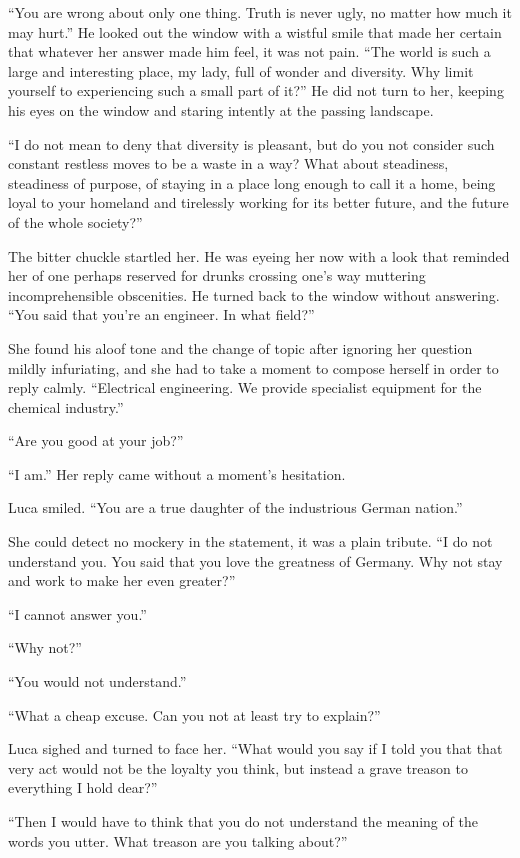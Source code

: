 ``You are wrong about only one thing. Truth is never ugly, no matter how much it may hurt.'' He looked out the window with a wistful smile that made her certain that whatever her answer made him feel, it was not pain. ``The world is such a large and interesting place, my lady, full of wonder and diversity. Why limit yourself to experiencing such a small part of it?'' He did not turn to her, keeping his eyes on the window and staring intently at the passing landscape.

``I do not mean to deny that diversity is pleasant, but do you not consider such constant restless moves to be a waste in a way? What about steadiness, steadiness of purpose, of staying in a place long enough to call it a home, being loyal to your homeland and tirelessly working for its better future, and the future of the whole society?''

The bitter chuckle startled her. He was eyeing her now with a look that reminded her of one perhaps reserved for drunks crossing one's way muttering incomprehensible obscenities. He turned back to the window without answering. ``You said that you're an engineer. In what field?''

She found his aloof tone and the change of topic after ignoring her question mildly infuriating, and she had to take a moment to compose herself in order to reply calmly. ``Electrical engineering. We provide specialist equipment for the chemical industry.''

``Are you good at your job?''

``I am.'' Her reply came without a moment's hesitation.

Luca smiled. ``You are a true daughter of the industrious German nation.''

She could detect no mockery in the statement, it was a plain tribute. ``I do not understand you. You said that you love the greatness of Germany. Why not stay and work to make her even greater?''

``I cannot answer you.''

``Why not?''

``You would not understand.''

``What a cheap excuse. Can you not at least try to explain?''

Luca sighed and turned to face her. ``What would you say if I told you that that very act would not be the loyalty you think, but instead a grave treason to everything I hold dear?''

``Then I would have to think that you do not understand the meaning of the words you utter. What treason are you talking about?''

